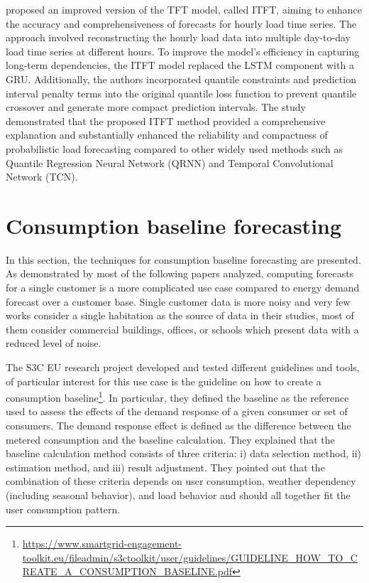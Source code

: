 \cite{LI2023108743} proposed an improved version of the TFT model, called ITFT, aiming to enhance the accuracy and comprehensiveness of forecasts for hourly load time series.
The approach involved reconstructing the hourly load data into multiple day-to-day load time series at different hours.
To improve the model's efficiency in capturing long-term dependencies, the ITFT model replaced the LSTM component with a GRU.
Additionally, the authors incorporated quantile constraints and prediction interval penalty terms into the original quantile loss function to prevent quantile crossover and generate more compact prediction intervals.
The study demonstrated that the proposed ITFT method provided a comprehensive explanation and substantially enhanced the reliability and compactness of probabilistic load forecasting compared to other widely used methods such as Quantile Regression Neural Network (QRNN) and Temporal Convolutional Network (TCN).


\section{Consumption baseline forecasting}
\label{sec:baselinesoa}
\vspace{0.2 cm}

In this section, the techniques for consumption baseline forecasting are presented.
As demonstrated by most of the following papers analyzed, computing forecasts for a single customer is a more complicated use case compared to energy demand forecast over a customer base.
Single customer data is more noisy and very few works consider a single habitation as the source of data in their studies, most of them consider commercial buildings, offices, or schools which present data with a reduced level of noise.

The S3C EU research project developed and tested different guidelines and tools, of particular interest for this use case is the guideline on how to create a consumption baseline\footnote{ \url{https://www.smartgrid-engagement-toolkit.eu/fileadmin/s3ctoolkit/user/guidelines/GUIDELINE_HOW_TO_CREATE_A_CONSUMPTION_BASELINE.pdf} }.
In particular, they defined the baseline as the reference used to assess the effects of the demand response of a given consumer or set of consumers.
The demand response effect is defined as the difference between the metered consumption and the baseline calculation.
They explained that the baseline calculation method consists of three criteria:
i) data selection method,
ii) estimation method,
and iii) result adjustment.
They pointed out that the combination of these criteria depends on user consumption, weather dependency (including seasonal behavior), and load behavior and should all together fit the user consumption pattern.


